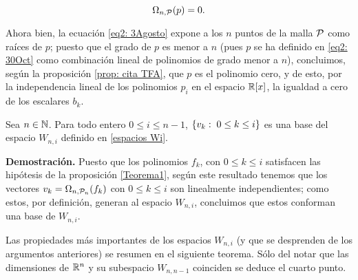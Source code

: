 \begin{equation} \label{eq2: 3Agosto}
\Omega_{n , \mathcal{P}} (p) = 0.
\end{equation}

Ahora bien, 
la ecuación \eqref{eq2: 3Agosto}
expone a los $n$ puntos
de la malla $\mathcal{P}$ como raíces de $p$;  puesto que
el grado de $p$ es menor a $n$
(pues $p$ se ha definido en \eqref{eq2: 30Oct} como
combinación lineal de polinomios de grado menor
a $n$), 
concluimos, según la proposición \ref{prop: cita TFA},
que $p$ es el polinomio cero, 
y de esto, por la
independencia lineal de los polinomios $p_{i}$
en el espacio $\mathbb{R}[x]$, la
igualdad a cero de los escalares $b_{k}$. 
\QEDB
\vspace{0.2cm}

\begin{prop}
Sea $n \in \mathbb{N}$. Para todo entero $0 \leq i \leq n-1$, 
$\{v_{k}: \hspace{0.1cm} 0\leq k \leq i \}$ es una base
del espacio $W_{n,i}$
definido en \eqref{espacios Wi}.
\end{prop}
\noindent
\textbf{Demostración.}
Puesto que los polinomios $f_{k}$, con $0 \leq k \leq i$
satisfacen las hipótesis de la proposición \ref{Teorema1},
según este resultado
tenemos que los vectores $v_{k}= \Omega_{n, \mathcal{P}_{n}}(f_{k})$ 
con $0 \leq k \leq i$
son linealmente independientes; como estos, 
por definición,
generan al espacio $W_{n,i}$, concluimos que 
estos conforman una base de $W_{n,i}$.
\QEDB
\vspace{0.2cm}

Las propiedades más importantes de los
espacios $W_{n,i}$ (y que se desprenden
de los argumentos anteriores) se 
resumen en el siguiente teorema. 
Sólo del notar que las dimensiones de 
$\mathbb{R}^{n}$ y su subespacio $W_{n, n-1}$
coinciden se deduce el cuarto punto.


